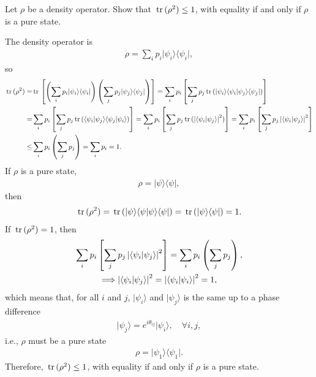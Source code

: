 \documentclass[en]{sol-man}
\begin{document}
\begin{exe}
    Let $\rho$ be a density operator. Show that $\,\mathrm{tr}\,(\rho^2)\leq 1$, with equality if and only if $\rho$ is a pure state.
\end{exe}
\begin{pf}
    The density operator is
    \begin{align}
        \rho=\sum_ip_i\lvert\psi_i\rangle\langle\psi_i\rvert,
    \end{align}
    so
    \begin{align}
        \notag\,\mathrm{tr}\,(\rho^2)=&\,\mathrm{tr}\,\left[\left(\sum_ip_i\lvert\psi_i\rangle\langle\psi_i\rvert\right)\left(\sum_jp_j\lvert\psi_j\rangle\langle\psi_j\rvert\right)\right]=\sum_ip_i\left[\sum_jp_j\,\mathrm{tr}\,(\lvert\psi_i\rangle\langle\psi_i\vert\psi_j\rangle\langle\psi_j\rvert)\right]\\
        \notag=&\sum_ip_i\left[\sum_jp_j\,\mathrm{tr}\,(\langle\psi_i\vert\psi_j\rangle\langle\psi_j\vert\psi_i\rangle)\right]=\sum_ip_i\left[\sum_jp_j\,\mathrm{tr}\,(\left\lvert\langle\psi_i\vert\psi_j\rangle\right\rvert^2)\right]=\sum_ip_i\left[\sum_jp_j\left\lvert\langle\psi_i\vert\psi_j\rangle\right\rvert^2\right]\\
        \leq&\sum_ip_i\left(\sum_jp_j\right)=\sum_ip_i=1.
    \end{align}
    If $\rho$ is a pure state,
    \begin{align}
        \rho=\lvert\psi\rangle\langle\psi\rvert,
    \end{align}
    then
    \begin{align}
        \,\mathrm{tr}\,(\rho^2)=\,\mathrm{tr}\,(\lvert\psi\rangle\langle\psi\vert\psi\rangle\langle\psi\rvert)=\,\mathrm{tr}\,(\lvert\psi\rangle\langle\psi\rvert)=1.
    \end{align}
    If $\,\mathrm{tr}\,(\rho^2)=1$, then
    \begin{gather}
        \sum_ip_i\left[\sum_jp_j\left\lvert\langle\psi_i\vert\psi_j\rangle\right\rvert^2\right]=\sum_ip_i\left(\sum_jp_j\right),\\
        \Longrightarrow\left\lvert\langle\psi_i\vert\psi_j\rangle\right\rvert^2=\left\lvert\langle\psi_i\vert\psi_i\rangle\right\rvert^2=1,
    \end{gather}
    which means that, for all $i$ and $j$, $\lvert\psi_i\rangle$ and $\lvert\psi_j\rangle$ is the same up to a phase difference
    \begin{align}
        \lvert\psi_j\rangle=e^{i\theta_{ij}}\lvert\psi_i\rangle,\quad\forall i,j,
    \end{align}
    i.e., $\rho$ must be a pure state
    \begin{align}
        \rho=\lvert\psi_1\rangle\langle\psi_1\rvert.
    \end{align}
    Therefore, $\,\mathrm{tr}\,(\rho^2)\leq 1$, with equality if and only if $\rho$ is a pure state.
\end{pf}
\end{document}
